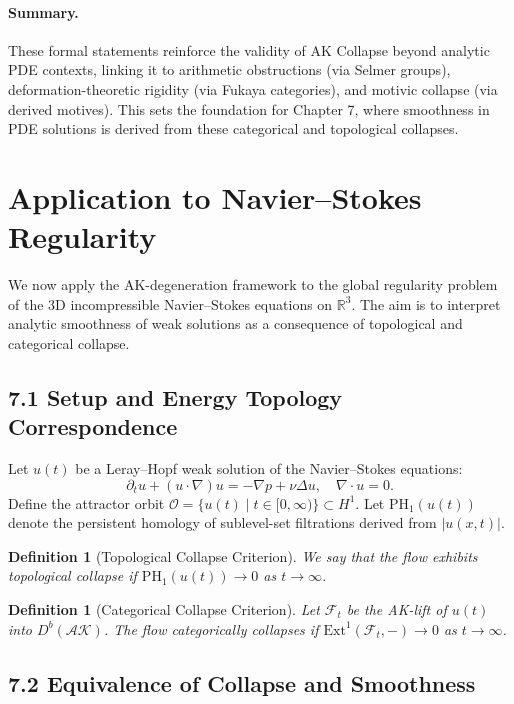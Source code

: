 \documentclass[11pt]{article}
\newtheorem{definition}[theorem]{Definition}
\begin{document}
\paragraph{Summary.}
These formal statements reinforce the validity of AK Collapse beyond analytic PDE contexts, linking it to arithmetic obstructions (via Selmer groups), deformation-theoretic rigidity (via Fukaya categories), and motivic collapse (via derived motives). This sets the foundation for Chapter 7, where smoothness in PDE solutions is derived from these categorical and topological collapses.




\section{Application to Navier--Stokes Regularity}

We now apply the AK-degeneration framework to the global regularity problem of the 3D incompressible Navier--Stokes equations on $\mathbb{R}^3$. The aim is to interpret analytic smoothness of weak solutions as a consequence of topological and categorical collapse.

\subsection{7.1 Setup and Energy Topology Correspondence}

Let $u(t)$ be a Leray–Hopf weak solution of the Navier--Stokes equations:
\[
\partial_t u + (u \cdot \nabla) u = -\nabla p + \nu \Delta u, \quad \nabla \cdot u = 0.
\]
Define the attractor orbit $\mathcal{O} = \{ u(t) \mid t \in [0, \infty) \} \subset H^1$. Let $\mathrm{PH}_1(u(t))$ denote the persistent homology of sublevel-set filtrations derived from $|u(x,t)|$.

\begin{definition}[Topological Collapse Criterion]
We say that the flow exhibits topological collapse if $\mathrm{PH}_1(u(t)) \to 0$ as $t \to \infty$.
\end{definition}

\begin{definition}[Categorical Collapse Criterion]
Let $\mathcal{F}_t$ be the AK-lift of $u(t)$ into $D^b(\mathcal{AK})$. The flow categorically collapses if $\mathrm{Ext}^1(\mathcal{F}_t, -) \to 0$ as $t \to \infty$.
\end{definition}

\subsection{7.2 Equivalence of Collapse and Smoothness}
\end{document}
